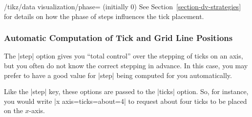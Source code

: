 \begin{key}{/tikz/data visualization/phase= (initially 0)}
    See Section~\ref{section-dv-strategies} for details on how the phase of steps influences the tick placement.
\end{key}


\subsubsection{Automatic Computation of Tick and Grid Line Positions}

The |step| option gives you ``total control'' over the stepping of ticks on an axis, but you often do not know the correct stepping in advance. In this case, you may prefer to have a good value for |step| being computed for you automatically.

Like the |step| key, these options are passed to the |ticks| option. So, for instance, you would write |x axis={ticks={about=4}}| to request about four ticks to be placed on the $x$-axis.

